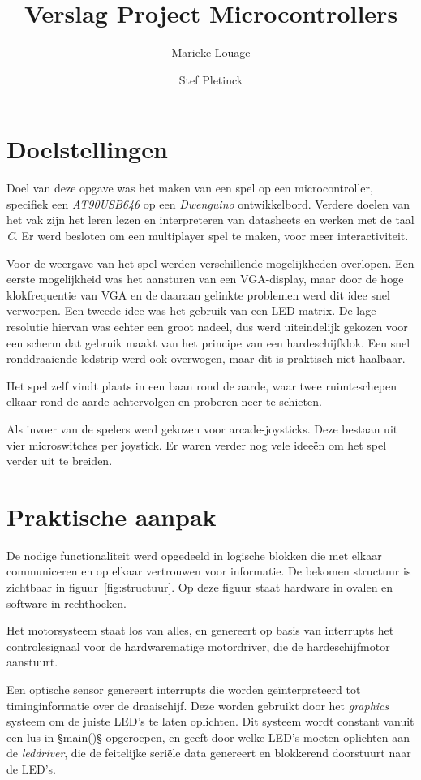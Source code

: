 \documentclass[12pt]{ugentreport}
\title{Verslag Project Microcontrollers}
\author{Marieke Louage\and Stef Pletinck}
\begin{document}
\maketitle

\tableofcontents
\listoffigures
\newpage

\section{Doelstellingen}
Doel van deze opgave was het maken van een spel op een microcontroller,
specifiek een \emph{AT90USB646} op een \emph{Dwenguino} ontwikkelbord.
Verdere doelen van het vak zijn het leren lezen en interpreteren van datasheets
en werken met de taal \emph{C}.
Er werd besloten om een multiplayer spel te maken,
voor meer interactiviteit.

Voor de weergave van het spel werden verschillende mogelijkheden overlopen.
Een eerste mogelijkheid was het aansturen van een VGA-display,
maar door de hoge klokfrequentie van VGA en de daaraan gelinkte problemen
werd dit idee snel verworpen.
Een tweede idee was het gebruik van een LED-matrix.
De lage resolutie hiervan was echter een groot nadeel,
dus werd uiteindelijk gekozen voor een scherm dat gebruik maakt
van het principe van een hardeschijfklok. Een snel ronddraaiende ledstrip werd
ook overwogen, maar dit is praktisch niet haalbaar.

Het spel zelf vindt plaats in een baan rond de aarde, waar twee ruimteschepen
elkaar rond de aarde achtervolgen en proberen neer te schieten.

Als invoer van de spelers werd gekozen voor arcade-joysticks.
Deze bestaan uit vier microswitches per joystick.
Er waren verder nog vele ideeën om het spel verder uit te breiden.

\section{Praktische aanpak}
De nodige functionaliteit werd opgedeeld in logische blokken die met elkaar
communiceren en op elkaar vertrouwen voor informatie. De bekomen structuur is
zichtbaar in figuur~\ref{fig:structuur}.
Op deze figuur staat hardware in ovalen en software in rechthoeken.

Het motorsysteem staat los van alles, en genereert op basis van interrupts het
controlesignaal voor de hardwarematige motordriver, die de hardeschijfmotor
aanstuurt.

Een optische sensor genereert interrupts die worden geïnterpreteerd tot
timinginformatie over de draaischijf. Deze worden gebruikt door het
\emph{graphics} systeem om de juiste LED's te laten oplichten. Dit systeem wordt
constant vanuit een lus in §main()§ opgeroepen, en geeft door welke LED's moeten
oplichten aan de \emph{leddriver}, die de feitelijke seriële data genereert en
blokkerend doorstuurt naar de LED's.
\end{document}
